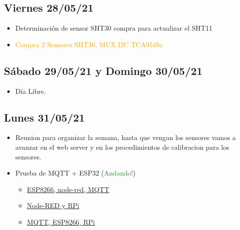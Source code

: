 \subsection*{Viernes 28/05/21}
\begin{itemize}
    \item Determinación de sensor SHT30 compra para actualizar el SHT11
    \item \textcolor{orange}{Compra 2 Sensores SHT30, MUX I2C TCA9548a}
\end{itemize}
\subsection*{Sábado 29/05/21 y Domingo 30/05/21}
    \begin{itemize}
        \item Día Libre.
    \end{itemize}

\subsection*{Lunes 31/05/21}
    \begin{itemize}
        \item Reunion para organizar la semana, hasta que vengan los sensores vamos a avanzar en el web server y en los procedimientos de calibracion para los sensores.
        \item Prueba de MQTT + ESP32 (\textcolor{ForestGreen}{Andando!})
        \begin{itemize}
            \item \href{https://randomnerdtutorials.com/esp8266-and-node-red-with-mqtt/}{ESP8266, node-red, MQTT}
            \item \href{https://randomnerdtutorials.com/getting-started-with-node-red-on-raspberry-pi/}{Node-RED y RPi}
            \item \href{https://programarfacil.com/esp8266/mqtt-esp8266-raspberry-pi/}{MQTT, ESP8266, RPi}
        \end{itemize}
    \end{itemize}

\clearpage